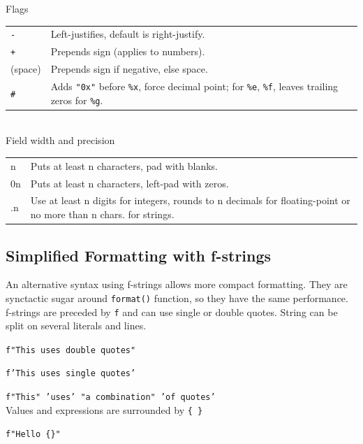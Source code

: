 \hangpar \textsf{Flags}\\
\begin{tabular}{@{}lp{}}
\texttt{-} & Left-justifies, default is right-justify. \\
\texttt{+} & Prepends sign (applies to numbers). \\
(space) & Prepends sign if negative, else space. \\
\texttt{\#} & Adds \texttt{"0x"} before \texttt{\%x}, force decimal point; for \texttt{\%e}, \texttt{\%f}, leaves trailing zeros for \texttt{\%g}. \\
\end{tabular}\\

\hangpar \textsf{Field width} and \textsf{precision}\\
\begin{tabular}{@{}lp{}}
\textsf{n} & Puts at least \textsf{n} characters, pad with blanks. \\
\textsf{0n} & Puts at least \textsf{n} characters, left-pad with zeros. \\
\textsf{.n} & Use at least \textsf{n} digits for integers, rounds to \textsf{n} decimals for floating-point or no more than \textsf{n} chars. for strings. \\
\end{tabular}

\subsection*{Simplified Formatting with f-strings}

\hangpar An alternative syntax using f-strings allows more compact formatting.
They are synctactic sugar around \texttt{format()} function, so they have the same performance.\\

\hangpar f-strings are preceded by \texttt{f} and can use single or double quotes. String can be split on several literals and lines.

\texttt{f"This uses double quotes"}

\texttt{f'This uses single quotes'}

\texttt{f"This" 'uses' "a combination" 'of quotes'}\\

\hangpar Values and expressions are  surrounded by \texttt{\{ \}}

\texttt{f"Hello \{}\texttt{\}"}

